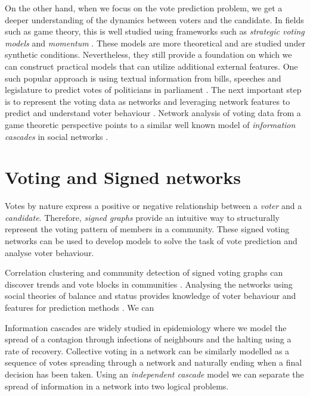 On the other hand, when we focus on the vote prediction problem, we get a deeper understanding of the dynamics between voters and the candidate. In fields such as game theory, this is well studied using frameworks such as \textit{strategic voting models} and \textit{momentum} \cite{meir2020strategic,zou2015strategicDoodle,ali2006a,banerjee1992simple}. These models are more theoretical and are studied under synthetic conditions. Nevertheless, they still provide a foundation on which we can construct practical models that can utilize additional external features. One such popular approach is using textual information from bills, speeches and legislature to predict votes of politicians in parliament \cite{budhwar2018predicting,gerrish2011predicting}. The next important step is to represent the voting data as networks and leveraging network features to predict and understand voter behaviour \cite{tal2015a,brito2020aBrazil,kearns2009behavioral,derr2018congressional,arinik2017signed}. Network analysis of voting data from a game theoretic perspective points to a similar well known model of \textit{information cascades} in social networks \cite{ali2006theory}.

\section{Voting and Signed networks}
Votes by nature express a positive or negative relationship between a \textit{voter} and a \textit{candidate}. Therefore, \textit{signed graphs} provide an intuitive way to structurally represent the voting pattern of members in a community. These signed voting networks can be used to develop models to solve the task of vote prediction and analyse voter behaviour.

Correlation clustering and community detection of signed voting graphs can discover trends and vote blocks in communities \cite{brito2020aBrazil,arinik2017signed}. Analysing the networks using social theories of balance and status provides knowledge of voter behaviour and features for prediction methods \cite{levorato2016brazilian,derr2018congressional}. We can 

Information cascades are widely studied in epidemiology where we model the spread of a contagion through infections of neighbours and the halting using a rate of recovery. Collective voting in a network can be similarly modelled as a sequence of votes spreading through a network and naturally ending when a final decision has been taken. Using an \textit{independent cascade} model we can separate the spread of information in a network into two logical problems.

